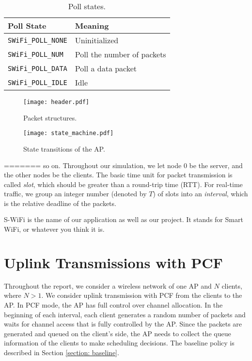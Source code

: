 \documentclass{article}
\begin{document}
\begin{table}[h!]
   \centering
   \caption{Poll states.}
   \label{tab:state}
   \begin{tabular}{| l | l |}
      \hline
      Poll State  &  Meaning\\ \hline
      \lstinline |SWiFi_POLL_NONE| & Uninitialized \\ \hline 
      \lstinline |SWiFi_POLL_NUM|  & Poll the number of packets\\ \hline 
      \lstinline |SWiFi_POLL_DATA| & Poll a data packet\\ \hline 
      \lstinline |SWiFi_POLL_IDLE| & Idle\\  
     \hline
   \end{tabular}
\end{table}

\begin{figure}[htbp]
\centering
\texttt{[image: header.pdf]}
\caption{Packet structures.}
\label{fig:packet}
\end{figure}


\begin{figure}[htbp]
\centering
\texttt{[image: state\_machine.pdf]}
\caption{State transitions of the AP.}
\label{fig:state}
\end{figure}
=======
so on. Throughout our simulation, we let node $0$ be the server, and the other nodes be the clients. The basic time unit for packet transmission is called \emph{slot}, which should be greater than a round-trip time (RTT). For real-time traffic, we group an integer number (denoted by $T$) of slots into an \emph{interval}, which is the relative deadline of the packets. 

S-WiFi is the name of our application as well as our project. It stands for
Smart WiFi, or whatever you think it is.


\section*{Uplink Transmissions with PCF}
\label{section: uplink}
Throughout the report, we consider a wireless network of one AP and $N$ clients, where $N>1$. We consider uplink transmission with PCF from the clients to the AP. In PCF mode, the AP has full control over channel allocation. In the beginning of each interval, each client generates a random number of packets and waits for channel access that is fully controlled by the AP. Since the packets are generated and queued on the client's side, the AP needs to collect the queue information of the clients to make scheduling decisions. The baseline policy is described in Section \ref{section: baseline}.
\end{document}
